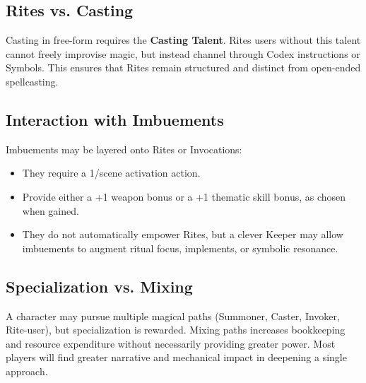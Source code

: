 \subsection{Rites vs. Casting}
Casting in free-form requires the \textbf{Casting Talent}. Rites users without this talent cannot freely improvise magic, but instead channel through Codex instructions or Symbols. This ensures that Rites remain structured and distinct from open-ended spellcasting.

\subsection{Interaction with Imbuements}
Imbuements may be layered onto Rites or Invocations:
\begin{itemize}
    \item They require a 1/scene activation action.
    \item Provide either a +1 weapon bonus or a +1 thematic skill bonus, as chosen when gained.
    \item They do not automatically empower Rites, but a clever Keeper may allow imbuements to augment ritual focus, implements, or symbolic resonance.
\end{itemize}

\subsection{Specialization vs. Mixing}
A character may pursue multiple magical paths (Summoner, Caster, Invoker, Rite-user), but specialization is rewarded. Mixing paths increases bookkeeping and resource expenditure without necessarily providing greater power. Most players will find greater narrative and mechanical impact in deepening a single approach.
